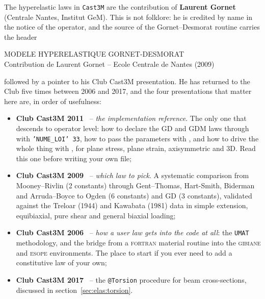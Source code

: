 %
%
The hyperelastic laws in \texttt{Cast3M} are the contribution of
\textbf{Laurent Gornet} (Centrale Nantes, Institut GeM). This is not
folklore: he is credited by name in the notice of the  operator, and
the source of the Gornet--Desmorat routine carries the header

\begin{center}\small\ttfamily
MODELE HYPERELASTIQUE GORNET-DESMORAT\\
Contribution de Laurent Gornet -- Ecole Centrale de Nantes (2009)
\end{center}

\noindent followed by a pointer to his Club Cast3M presentation. He has
returned to the Club five times between 2006 and 2017, and the four
presentations that matter here are, in order of usefulness:

\begin{itemize}
\item \textbf{Club Cast3M 2011}~\cite{Gornet:club2011} -- \emph{the
  implementation reference}. The only one that descends to operator level:
  how to declare the GD and GDM laws through  with
  \texttt{'NUME\_LOI' 33}, how to pass the parameters with , and how
  to drive the whole thing with , for plane stress, plane strain,
  axisymmetric and 3D. Read this one before writing your own file;
\item \textbf{Club Cast3M 2009}~\cite{Gornet:club2009} -- \emph{which law to
  pick}. A systematic comparison from Mooney--Rivlin (2 constants) through
  Gent--Thomas, Hart-Smith, Biderman and Arruda--Boyce to Ogden (6 constants)
  and GD (3 constants), validated against the Treloar (1944) and Kawabata
  (1981) data in simple extension, equibiaxial, pure shear and general
  biaxial loading;
\item \textbf{Club Cast3M 2006}~\cite{Gornet:club2006} -- \emph{how a user law
  gets into the code at all}: the \texttt{UMAT} methodology, and the bridge
  from a \textsc{fortran} material routine into the \textsc{gibiane} and
  \textsc{esope} environments. The place to start if you ever need to add a
  constitutive law of your own;
\item \textbf{Club Cast3M 2017}~\cite{Gornet:club2017} -- the \texttt{@Torsion}
  procedure for beam cross-sections, discussed in
  section~\ref{sec:elas:torsion}.
\end{itemize}

